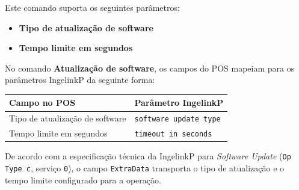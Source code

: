 \documentclass[a4paper,12pt]{article}
\begin{document}
Este comando suporta os seguintes parâmetros:

\begin{itemize}
    \item \textbf{Tipo de atualização de software}
    \item \textbf{Tempo limite em segundos}
\end{itemize}

No comando \textbf{Atualização de software}, os campos do POS mapeiam para os
parâmetros IngelinkP da seguinte forma:

\begin{longtable}{|p{5cm}|p{7cm}|}
\hline
\textbf{Campo no POS} & \textbf{Parâmetro IngelinkP} \\
\hline
Tipo de atualização de software & \texttt{software update type} \\
\hline
Tempo limite em segundos & \texttt{timeout in seconds} \\
\hline
\end{longtable}

De acordo com a especificação técnica da IngelinkP para \textit{Software
Update} (\texttt{Op Type c}, serviço \texttt{0}), o campo \texttt{ExtraData}
transporta o tipo de atualização e o tempo limite configurado para a operação.
\end{document}

